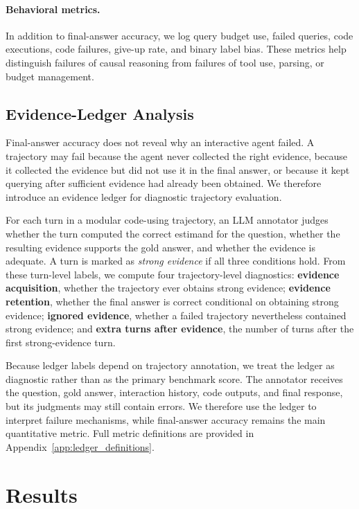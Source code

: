 \documentclass{article}
\begin{document}
\paragraph{Behavioral metrics.}
In addition to final-answer accuracy, we log query budget use, failed queries, code executions, code failures, give-up rate, and binary label bias.
These metrics help distinguish failures of causal reasoning from failures of tool use, parsing, or budget management.

\subsection{Evidence-Ledger Analysis}
\label{subsec:ledger_method}

Final-answer accuracy does not reveal why an interactive agent failed.
A trajectory may fail because the agent never collected the right evidence, because it collected the evidence but did not use it in the final answer, or because it kept querying after sufficient evidence had already been obtained.
We therefore introduce an evidence ledger for diagnostic trajectory evaluation.

For each turn in a modular code-using trajectory, an LLM annotator judges whether the turn computed the correct estimand for the question, whether the resulting evidence supports the gold answer, and whether the evidence is adequate.
A turn is marked as \emph{strong evidence} if all three conditions hold.
From these turn-level labels, we compute four trajectory-level diagnostics:
\textbf{evidence acquisition}, whether the trajectory ever obtains strong evidence;
\textbf{evidence retention}, whether the final answer is correct conditional on obtaining strong evidence;
\textbf{ignored evidence}, whether a failed trajectory nevertheless contained strong evidence; and
\textbf{extra turns after evidence}, the number of turns after the first strong-evidence turn.

Because ledger labels depend on trajectory annotation, we treat the ledger as diagnostic rather than as the primary benchmark score.
The annotator receives the question, gold answer, interaction history, code outputs, and final response, but its judgments may still contain errors.
We therefore use the ledger to interpret failure mechanisms, while final-answer accuracy remains the main quantitative metric.
Full metric definitions are provided in Appendix~\ref{app:ledger_definitions}.

\section{Results}
\label{sec:results}
\end{document}
